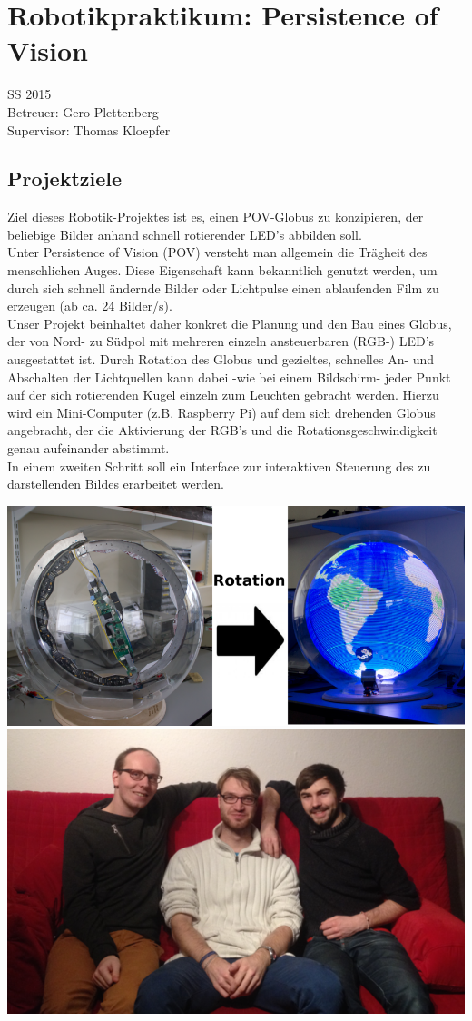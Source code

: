 \documentclass{scrreprt}
\begin{document}
\chapter*{Robotikpraktikum: Persistence of Vision}
\vspace{-.25cm}

\begin{center}
SS 2015\\
Betreuer: Gero Plettenberg\\
Supervisor: Thomas Kloepfer
\end{center}
\vspace{-.2cm}


\section{Projektziele}

Ziel dieses Robotik-Projektes ist es, einen POV-Globus zu konzipieren, der beliebige Bilder anhand schnell rotierender LED's abbilden soll.\\
Unter Persistence of Vision (POV) versteht man allgemein die Trägheit des menschlichen Auges. Diese Eigenschaft kann bekanntlich genutzt werden, um durch sich schnell ändernde Bilder oder Lichtpulse einen ablaufenden Film zu erzeugen (ab ca. 24 Bilder/s).\\
Unser Projekt beinhaltet daher konkret die Planung und den Bau eines Globus, der von Nord- zu Südpol mit mehreren einzeln ansteuerbaren (RGB-) LED's ausgestattet ist. Durch Rotation des Globus und gezieltes, schnelles An- und Abschalten der Lichtquellen kann dabei -wie bei einem Bildschirm- jeder Punkt auf der sich rotierenden Kugel einzeln zum Leuchten gebracht werden. Hierzu wird ein Mini-Computer (z.B. Raspberry Pi) auf dem sich drehenden Globus angebracht, der die Aktivierung der RGB's und die Rotationsgeschwindigkeit genau aufeinander abstimmt.\\
In einem zweiten Schritt soll ein Interface zur interaktiven Steuerung des zu darstellenden Bildes erarbeitet werden.\\


\begin{center}
\includegraphics[height=.24\textwidth]{pov.png}\qquad\qquad
\includegraphics[height=.24\textwidth]{team.png}
\end{center}
\end{document}
